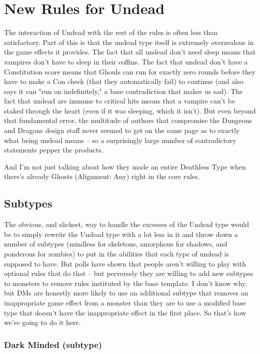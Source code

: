 \section{New Rules for Undead}

The interaction of Undead with the rest of the rules is often less than satisfactory. Part of this is that the undead type itself is extremely overzealous in the game effects it provides. The fact that all undead don't need sleep means that vampires don't have to sleep in their coffins. The fact that undead don't have a Constitution score means that Ghouls can run for exactly zero rounds before they have to make a Con check (that they automatically fail) to continue (and also says it can "run on indefinitely," a base contradiction that makes us sad). The fact that undead are immune to critical hits means that a vampire can't be staked through the heart (even if it was sleeping, which it isn't). But even beyond that fundamental error, the multitude of authors that compromise the Dungeons and Dragons design staff never seemed to get on the same page as to exactly what being undead means -- so a surprisingly large number of contradictory statements pepper the products.

And I'm not just talking about how they made an entire Deathless Type when there's already Ghosts (Alignment: Any) right in the core rules.

\subsection{Subtypes}

The obvious, and slickest, way to handle the excesses of the Undead type would be to simply rewrite the Undead type with a lot less in it and throw down a number of subtypes (mindless for skeletons, amorphous for shadows, and ponderous for zombies) to put in the abilities that each type of undead is supposed to have. But polls have shown that people aren't willing to play with optional rules that do that -- but perversely they are willing to add new subtypes to monsters to remove rules instituted by the base template. I don't know why, but DMs are honestly more likely to use an additional subtype that removes an inappropriate game effect from a monster than they are to use a modified base type that doesn't have the inappropriate effect in the first place. So that's how we're going to do it here.


\subsubsection{Dark Minded (subtype)} \label{undead:darkminded}

